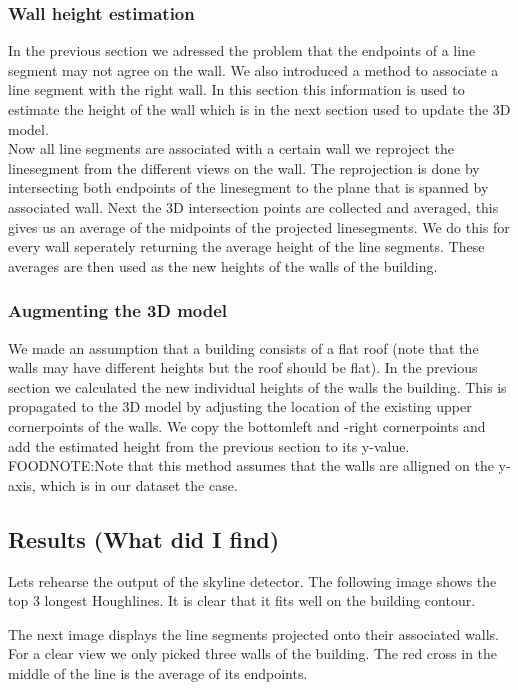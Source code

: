 \documentclass[10pt]{article}
\begin{document}
\subsubsection{Wall height estimation}
	In the previous section we adressed the problem that the endpoints of a line segment may not agree on the wall.  We also introduced a method to associate a line segment with the right wall. In this section this information is used to estimate the height of the wall which is in the next section used to update the 3D model.\\
	Now all line segments are associated with a certain wall we reproject the linesegment from the different views on the wall. The reprojection is done by intersecting both endpoints of the linesegment to the plane that is spanned by associated wall.
	Next the 3D intersection points are collected and averaged, this gives us an average of the midpoints of the projected linesegments. We do this for every wall seperately returning the average height of the line segments.
	These averages are then used as the new heights of the walls of the building.

\subsubsection{Augmenting the 3D model} %
	We made an assumption that a building consists of a flat roof (note that the walls may have different heights but the roof should be flat).
	In the previous section we calculated the new individual heights of the walls the building. 
	This is propagated to the 3D model by adjusting the location of the existing upper cornerpoints of the walls. We copy the bottomleft and -right cornerpoints and add the estimated height from the previous section to its y-value.
	FOODNOTE:Note that this method assumes that the walls are alligned on the y-axis, which is in our dataset the case.

	

\subsection{Results (What did I find)}
Lets rehearse the output of the skyline detector.
The following image shows the top 3 longest Houghlines. It is clear that it fits
well on the building contour.

The next image displays the line segments projected onto their associated walls.
For a clear view we only picked three walls of the building.
The red cross in the middle of the line is the average of its endpoints.
\end{document}
